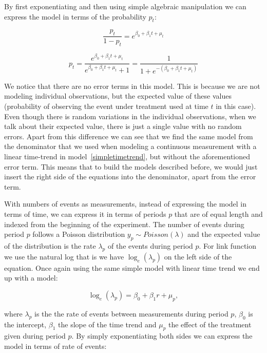 \documentclass[12pt,a4paper,leqno]{report}
\theoremstyle{plain}
\theoremstyle{definition}
\theoremstyle{remark}
\begin{document}
By first exponentiating and then using simple algebraic manipulation we can
express the model in terms of the probability \(p_t\):

\begin{def}\label{}
    \begin{equation}\label{}
        \frac{p_t}{1-p_t}=e^{\beta_0 + \beta_1 t + \mu_t}
    \end{equation}
\end{def}

\begin{def}\label{}
    \begin{equation}\label{}
        p_t=\frac{e^{\beta_0 + \beta_1 t + \mu_t}}{e^{\beta_0 + \beta_1 t + \mu_t}+1}=\frac{1}{1+e^{-(\beta_0 + \beta_1 t + \mu_t)}}
    \end{equation}
\end{def}

We notice that there are no error terms in this model. This is because we are
not modeling individual observations, but the expected value of these values
(probability of observing the event under treatment used at time \(t\) in this
case). Even though there is random variations in the individual observations,
when we talk about their expected value, there is just a single value with no
random errors. Apart from this difference we can see that we find the same model
from the denominator that we used when modeling a continuous measurement with a
linear time-trend in model\ \ref{simpletimetrend}, but without the
aforementioned error term. This means that to build the models described before,
we would just insert the right side of the equations into the denominator, apart
from the error term.

With numbers of events as measurements, instead of expressing the model in terms
of time, we can express it in terms of periods \(p\) that are of equal length
and indexed from the beginning of the experiment. The number of events during
period \(p\) follows a Poisson distribution \(y_p \sim Poisson(\lambda)\) and
the expected value of the distribution is the rate \(\lambda_p \) of the events
during period \(p\). For link function we use the natural log that is we have
\(\log_e(\lambda_p)\) on the left side of the equation. Once again using the
same simple model with linear time trend we end up with a model:

\begin{def}\label{oneerror}
    \begin{equation}
        \log_e(\lambda_p)=\beta_0 + \beta_1 r + \mu_{p},
    \end{equation}
\end{def}where \(\lambda_p\) is the the rate of events between measurements
during period \(p\), \(\beta_0\) is the intercept, \(\beta_1\) the slope of the
time trend and \(\mu_p\) the effect of the treatment given during period \(p\).
By simply exponentiating both sides we can express the model in terms of rate of
events:
\end{document}
